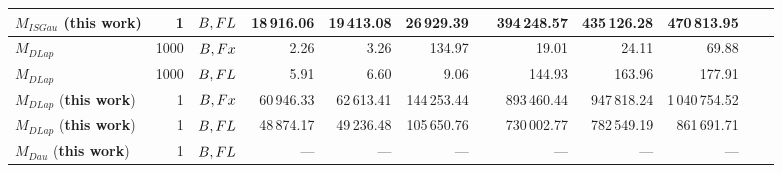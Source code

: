 \begin{table}
{\begin{tabular}{ l r c r r r r r r r r r}
            \midrule
            $M_{ISGau}$ (\textbf{this work})                     & 1       & $B,FL$ & 18\,916.06              & 19\,413.08 & 26\,929.39              &  & 394\,248.57 & 435\,126.28 & 470\,813.95    \\
            \midrule
            $M_{DLap}$~\cite{eigner2014differentially}           & 1000    & $B,Fx$ & 2.26                    & 3.26       & 134.97                  &  & 19.01       & 24.11       & 69.88          \\
            $M_{DLap}$~\cite{eigner2014differentially}           & 1000    & $B,FL$ & 5.91                    & 6.60       & 9.06                    &  & 144.93      & 163.96      & 177.91         \\
            $M_{DLap}$ (\textbf{this work})                      & 1       & $B,Fx$ & 60\,946.33              & 62\,613.41 & 144\,253.44             &  & 893\,460.44 & 947\,818.24 & 1\,040\,754.52 \\
            $M_{DLap}$ (\textbf{this work})                      & 1       & $B,FL$ & 48\,874.17              & 49\,236.48 & 105\,650.76             &  & 730\,002.77 & 782\,549.19 & 861\,691.71    \\
            \midrule
            $M_{Dau}$ (\textbf{this work})                       & 1       & $B,FL$ & ---                     & ---        & ---                     &  & ---         & ---         & ---            \\
            \bottomrule
        \end{tabular}
    }
\end{table}
\FloatBarrier














